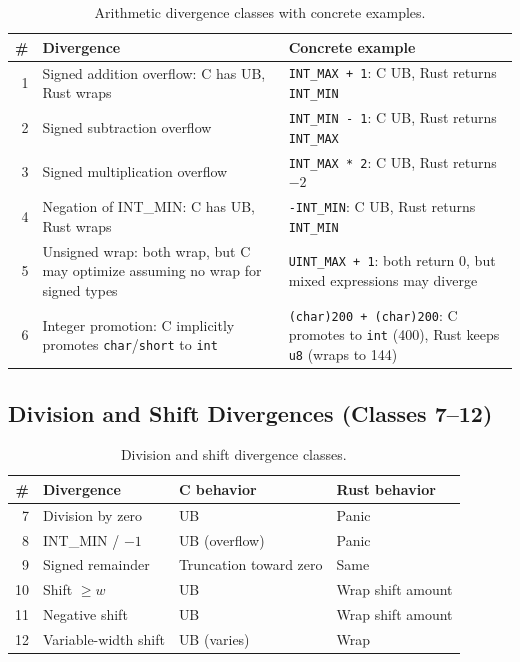 \documentclass[10pt,a4paper]{article}
\begin{document}
\begin{appendices}
\begin{table}[h!]
\centering
\small
\caption{Arithmetic divergence classes with concrete examples.}
\label{tab:arith-details}
\begin{tabular}{@{}rp{5cm}p{6cm}@{}}
\toprule
\# & Divergence & Concrete example \\
\midrule
1 & Signed addition overflow: C has UB, Rust wraps &
  \texttt{INT\_MAX + 1}: C UB, Rust returns
  \texttt{INT\_MIN} \\
2 & Signed subtraction overflow &
  \texttt{INT\_MIN - 1}: C UB, Rust returns
  \texttt{INT\_MAX} \\
3 & Signed multiplication overflow &
  \texttt{INT\_MAX * 2}: C UB, Rust returns $-2$ \\
4 & Negation of INT\_MIN: C has UB, Rust wraps &
  \texttt{-INT\_MIN}: C UB, Rust returns
  \texttt{INT\_MIN} \\
5 & Unsigned wrap: both wrap, but C may optimize
  assuming no wrap for signed types &
  \texttt{UINT\_MAX + 1}: both return 0, but
  mixed expressions may diverge \\
6 & Integer promotion: C implicitly promotes
  \texttt{char}/\texttt{short} to \texttt{int} &
  \texttt{(char)200 + (char)200}: C promotes to
  \texttt{int} (400), Rust keeps \texttt{u8} (wraps to 144) \\
\bottomrule
\end{tabular}
\end{table}

\subsection{Division and Shift Divergences (Classes 7--12)}

\begin{table}[h!]
\centering
\small
\caption{Division and shift divergence classes.}
\label{tab:div-shift-details}
\begin{tabular}{@{}rp{4cm}p{3cm}p{3cm}@{}}
\toprule
\# & Divergence & C behavior & Rust behavior \\
\midrule
7 & Division by zero & UB & Panic \\
8 & INT\_MIN / $-1$ & UB (overflow) & Panic \\
9 & Signed remainder & Truncation toward zero & Same \\
10 & Shift $\geq w$ & UB & Wrap shift amount \\
11 & Negative shift & UB & Wrap shift amount \\
12 & Variable-width shift & UB (varies) & Wrap \\
\bottomrule
\end{tabular}
\end{table}


\end{appendices}
\end{document}
